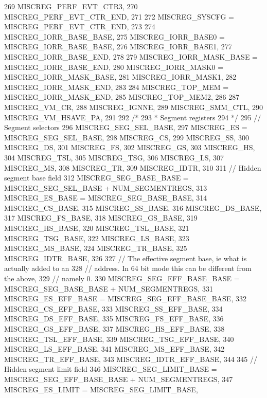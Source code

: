 \begin{DoxyCode}
{269         MISCREG_PERF_EVT_CTR3,
270         MISCREG_PERF_EVT_CTR_END,
271 
272         MISCREG_SYSCFG = MISCREG_PERF_EVT_CTR_END,
273 
274         MISCREG_IORR_BASE_BASE,
275         MISCREG_IORR_BASE0 = MISCREG_IORR_BASE_BASE,
276         MISCREG_IORR_BASE1,
277         MISCREG_IORR_BASE_END,
278 
279         MISCREG_IORR_MASK_BASE = MISCREG_IORR_BASE_END,
280         MISCREG_IORR_MASK0 = MISCREG_IORR_MASK_BASE,
281         MISCREG_IORR_MASK1,
282         MISCREG_IORR_MASK_END,
283 
284         MISCREG_TOP_MEM = MISCREG_IORR_MASK_END,
285         MISCREG_TOP_MEM2,
286 
287         MISCREG_VM_CR,
288         MISCREG_IGNNE,
289         MISCREG_SMM_CTL,
290         MISCREG_VM_HSAVE_PA,
291 
292         /*
293          * Segment registers
294          */
295         // Segment selectors
296         MISCREG_SEG_SEL_BASE,
297         MISCREG_ES = MISCREG_SEG_SEL_BASE,
298         MISCREG_CS,
299         MISCREG_SS,
300         MISCREG_DS,
301         MISCREG_FS,
302         MISCREG_GS,
303         MISCREG_HS,
304         MISCREG_TSL,
305         MISCREG_TSG,
306         MISCREG_LS,
307         MISCREG_MS,
308         MISCREG_TR,
309         MISCREG_IDTR,
310 
311         // Hidden segment base field
312         MISCREG_SEG_BASE_BASE = MISCREG_SEG_SEL_BASE + NUM_SEGMENTREGS,
313         MISCREG_ES_BASE = MISCREG_SEG_BASE_BASE,
314         MISCREG_CS_BASE,
315         MISCREG_SS_BASE,
316         MISCREG_DS_BASE,
317         MISCREG_FS_BASE,
318         MISCREG_GS_BASE,
319         MISCREG_HS_BASE,
320         MISCREG_TSL_BASE,
321         MISCREG_TSG_BASE,
322         MISCREG_LS_BASE,
323         MISCREG_MS_BASE,
324         MISCREG_TR_BASE,
325         MISCREG_IDTR_BASE,
326 
327         // The effective segment base, ie what is actually added to an
328         // address. In 64 bit mode this can be different from the above,
329         // namely 0.
330         MISCREG_SEG_EFF_BASE_BASE = MISCREG_SEG_BASE_BASE + NUM_SEGMENTREGS,
331         MISCREG_ES_EFF_BASE = MISCREG_SEG_EFF_BASE_BASE,
332         MISCREG_CS_EFF_BASE,
333         MISCREG_SS_EFF_BASE,
334         MISCREG_DS_EFF_BASE,
335         MISCREG_FS_EFF_BASE,
336         MISCREG_GS_EFF_BASE,
337         MISCREG_HS_EFF_BASE,
338         MISCREG_TSL_EFF_BASE,
339         MISCREG_TSG_EFF_BASE,
340         MISCREG_LS_EFF_BASE,
341         MISCREG_MS_EFF_BASE,
342         MISCREG_TR_EFF_BASE,
343         MISCREG_IDTR_EFF_BASE,
344 
345         // Hidden segment limit field
346         MISCREG_SEG_LIMIT_BASE = MISCREG_SEG_EFF_BASE_BASE + NUM_SEGMENTREGS,
347         MISCREG_ES_LIMIT = MISCREG_SEG_LIMIT_BASE,
}
\end{DoxyCode}

